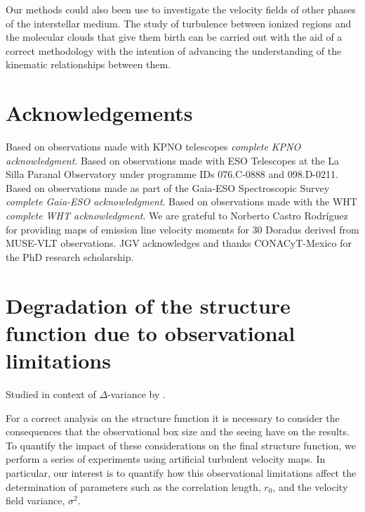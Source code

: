 \documentclass[fleqn,usenatbib, useAMS, a4paper]{mnras}
\begin{document}
Our methods could also been use to investigate the velocity fields of other phases of the interstellar medium.
The study of turbulence between ionized regions and the molecular clouds that give them birth can be carried out with the aid of a correct methodology with the intention of advancing the understanding of the kinematic relationships between them.




\section*{Acknowledgements}

Based on observations made with KPNO telescopes
\textit{complete KPNO acknowledgment}.
Based on observations made with ESO Telescopes at the La Silla Paranal Observatory under programme IDs 076.C-0888 and 098.D-0211.
Based on observations made as part of the Gaia-ESO Spectroscopic Survey
\textit{complete Gaia-ESO acknowledgment}.
Based on observations made with the WHT
\textit{complete WHT acknowledgment}.
We are grateful to Norberto Castro Rodríguez for providing maps of emission line velocity moments for 30 Doradus derived from MUSE-VLT observations.
JGV acknowledges and thanks CONACyT-Mexico for the PhD research scholarship.







\appendix

\section{Degradation of the structure function due to observational limitations}
\label{sec:degr-struct-funct}
Studied in context of \(\Delta\)-variance by \citet{Bensch:2001l}.

For a correct analysis on the structure function it is necessary to consider the consequences that the observational box size and the seeing have on the results.
To quantify the impact of these considerations on the final structure function, we perform a series of experiments using artificial turbulent velocity maps.
In particular, our interest is to quantify how this observational limitations affect the determination of parameters such as the correlation length, \(r_0\), and the velocity field variance, \(\sigma^2 \). 
\end{document}
